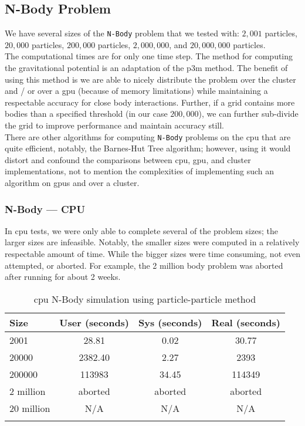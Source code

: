 \subsection{N-Body Problem}

We have several sizes of the \texttt{N-Body} problem that we tested with:
$2,001$ particles, $20,000$ particles, $200,000$ particles, $2,000,000$, and
$20,000,000$ particles.\\

The computational times are for only one time step. The method for computing
the gravitational potential is an adaptation of the \gls{p3m} method. The
benefit of using this method is we are able to nicely distribute the problem
over the \gls{cluster} and / or over a \gls{gpu} (because of memory
limitations) while maintaining a respectable accuracy for close body
interactions. Further, if a grid contains more bodies than a specified
threshold (in our case $200,000$), we can further sub-divide the grid to
improve performance and maintain accuracy still.\\

There are other algorithms for computing \texttt{N-Body} problems on the
\gls{cpu} that are quite efficient, notably, the Barnes-Hut Tree
algorithm\cite{barneshut1986}; however, using it would distort and confound the
comparisons between \gls{cpu}, \gls{gpu}, and \gls{cluster} implementations,
not to mention the complexities of implementing such an algorithm on
\glspl{gpu} and over a \gls{cluster}.

\subsubsection{N-Body --- CPU}

In \gls{cpu} tests, we were only able to complete several of the problem sizes;
the larger sizes are infeasible. Notably, the smaller sizes were computed in a
relatively respectable amount of time. While the bigger sizes were time
consuming, not even attempted, or aborted. For example, the 2 million body
problem was aborted after running for about 2 weeks.

\begin{table}[htb]
\centering{}
\begin{tabular}{lccc}
\toprule{}
\textbf{Size} & \textbf{User (seconds)} &
\textbf{Sys (seconds)} & \textbf{Real (seconds)} \\
\midrule{}
2001          & 28.81   & 0.02    & 30.77   \\
\midrule{}
20000         & 2382.40 & 2.27    & 2393    \\
\midrule{}
200000        & 113983  & 34.45   & 114349  \\
\midrule{}
2 million     & aborted & aborted & aborted \\
\midrule{}
20 million    & N/A     & N/A     & N/A     \\
\bottomrule{}
\end{tabular}
\caption{\gls{cpu} N-Body simulation using particle-particle method}
\label{tab:cpu_nbody}
\end{table}


